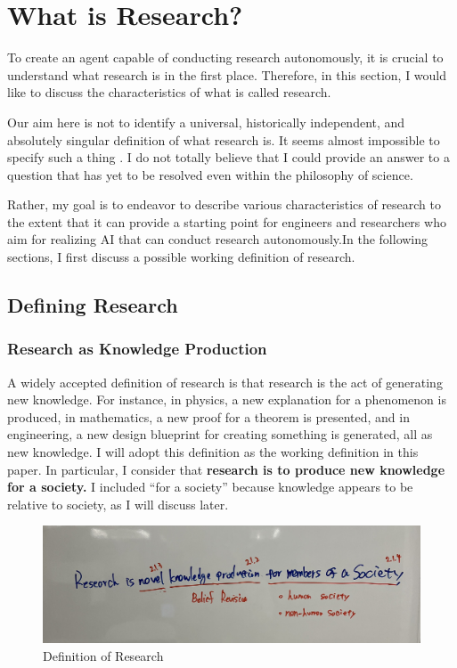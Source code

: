 \chapter{What is Research?}
\label{chapter-what-is-research}

To create an agent capable of conducting research autonomously, it is crucial to understand what research is in the first place. Therefore, in this section, I would like to discuss the characteristics of what is called research.

Our aim here is not to identify a universal, historically independent, and absolutely singular definition of what research is. It seems almost impossible to specify such a thing \cite{chalmers2013thing,sep-scientific-method}. I do not totally believe that I could provide an answer to a question that has yet to be resolved even within the philosophy of science.

Rather, my goal is to endeavor to describe various characteristics of research to the extent that it can provide a starting point for engineers and researchers who aim for realizing AI that can conduct research autonomously.In the following sections, I first discuss a possible working definition of research.

\section{Defining Research}

\subsection{Research as Knowledge Production}

A widely accepted definition of research is that research is the act of generating new knowledge. For instance, in physics, a new explanation for a phenomenon is produced, in mathematics, a new proof for a theorem is presented, and in engineering, a new design blueprint for creating something is generated, all as new knowledge. I will adopt this definition as the working definition in this paper. In particular, I consider that \textbf{research is to produce new knowledge for a society.} I included ``for a society'' because knowledge appears to be relative to society, as I will discuss later.

\begin{figure}[htb]
    \centering
    \includegraphics[width=\linewidth]{figs/definition.jpg}
    \caption{Definition of Research}
    \label{fig:definition}
\end{figure}

